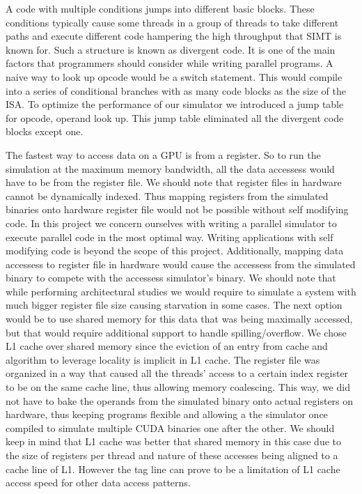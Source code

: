 \documentclass[conference, 10pt]{IEEEtran}
\begin{document}
A code with multiple conditions jumps into different basic blocks. These conditions typically 
cause some threads in a group of threads to take different paths and execute different code 
hampering the high throughput that SIMT is known for. Such a structure is known as divergent 
code. It is one of the main factors that programmers should consider while writing parallel 
programs. A naive way to look up opcode would be a switch statement. This would compile into 
a series of conditional branches with as many code blocks as the size of the ISA. To optimize 
the performance of our simulator we introduced a jump table for opcode, operand look up. This 
jump table eliminated all the divergent code blocks except one. 

The fastest way to access data on a GPU is from a register. So to run the simulation at the  
maximum memory bandwidth, all the data accessess would have to be from the register file. We should 
note that register files in hardware cannot be dynamically indexed. Thus mapping registers 
from the simulated binaries onto hardware register file would not be possible without self modifying 
code. In this project we concern ourselves with writing a parallel simulator to execute parallel code 
in the most optimal way. Writing applications with self modifying code is beyond the scope of this 
project. Additionally, mapping data accessess to register file in hardware would cause the accessess 
from the simulated binary to compete with the accessess simulator's binary. We should note that while 
performing architectural studies we would require to simulate a system with much bigger register file 
size causing starvation in some cases. The next option would be to use shared memory for this data that 
was being maximally accessed, but that would require additional support to handle spilling/overflow. 
We chose L1 cache over shared memory since the eviction of an entry from cache and algorithm to 
leverage locality is implicit in L1 cache. The register file was organized in a way that caused all 
the threads' access to a certain index register to be on the same cache line, thus allowing memory 
coalescing. This way, we did not have to bake the operands from the simulated binary onto actual 
registers on hardware, thus keeping programs flexible and allowing a the simulator once compiled to 
simulate multiple CUDA binaries one after the other. We should keep in mind that L1 cache was better 
that shared memory in this case due to the size of registers per thread and nature of these accesses 
being aligned to a cache line of L1. However the tag line can prove to be a limitation of L1 cache 
access speed for other data access patterns. 
\end{document}
